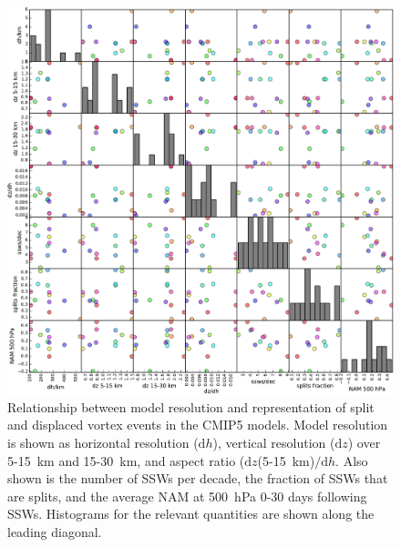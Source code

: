 \begin{figure}
 \centering
 \noindent\includegraphics[width=\textwidth]{figures/chapter-models/scatter_matrix.pdf}
 \caption[Relationship between model resolution and split and displaced vortex
 events in the CMIP5 models.]{Relationship between model resolution and
   representation of split and displaced vortex events in the CMIP5
   models. Model resolution is shown as horizontal resolution ($\mathrm{d}h$),
   vertical resolution ($\mathrm{d}z$) over 5-15~km and 15-30~km, and aspect
   ratio ($\mathrm{d}z$(5-15~km)$ / \mathrm{d}h$. Also shown is the number of
   SSWs per decade, the fraction of SSWs that are splits, and the average NAM at
   500~hPa 0-30 days following SSWs. Histograms for the relevant quantities
   are shown along the leading diagonal.}
 \label{Fig2}
\end{figure}


